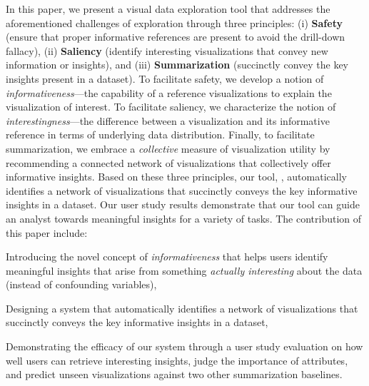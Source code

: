 \par In this paper, we present a visual data exploration tool that addresses the aforementioned challenges of exploration through three principles: (i) \textbf{Safety} (ensure that proper informative references are present to avoid the drill-down fallacy), (ii)  \textbf{Saliency} (identify interesting visualizations that convey new information or insights), and (iii) \textbf{Summarization} (succinctly convey the key insights present in a dataset). To facilitate safety, we develop a notion of \emph{informativeness}---the capability of a reference visualizations to explain the visualization of interest. To facilitate saliency, we characterize the notion of \emph{interestingness}---the difference between a visualization and its informative reference in terms of underlying data distribution. Finally, to facilitate summarization, we embrace a \emph{collective} measure of visualization utility by recommending a connected network of visualizations that collectively offer informative insights. Based on these three principles, our tool, \system, automatically identifies a network of visualizations that succinctly conveys the key informative insights in a dataset. Our user study results demonstrate that our tool can guide an analyst towards meaningful insights for a variety of tasks. The contribution of this paper include:
\begin{denselist}
\item Introducing the novel concept of \emph{informativeness} that helps users identify meaningful insights that arise from something \textit{actually interesting} about the data (instead of confounding variables),
\item Designing a system that automatically identifies a network of visualizations that succinctly conveys the key informative insights in a dataset,
\item Demonstrating the efficacy of our system through a user study evaluation on how well users can retrieve interesting insights, judge the importance of attributes, and predict unseen visualizations against two other summarization baselines.
\end{denselist}